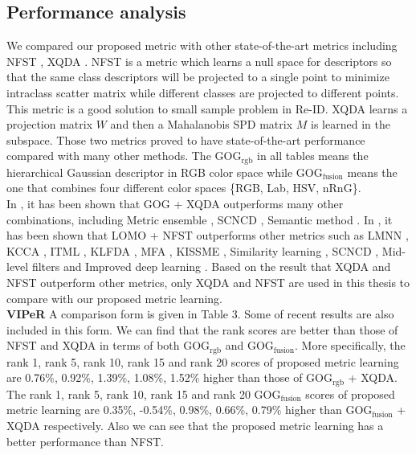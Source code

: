 \documentclass[10pt,twocolumn,letterpaper]{article}
\begin{document}
\subsection{Performance analysis}
We compared our proposed metric with other state-of-the-art metrics including NFST \cite{NFST}, XQDA \cite{LOMO}. NFST is a metric which learns a null space for descriptors so that the same class descriptors will be projected to a single point to minimize intraclass scatter matrix while different classes are projected to different points. This metric is a good solution to small sample problem in Re-ID. XQDA learns a projection matrix $W$ and then a Mahalanobis SPD matrix $M$ is learned in the subspace. Those two metrics proved to have state-of-the-art performance compared with many other methods. The GOG$_\text{rgb}$ in all tables means the hierarchical Gaussian descriptor in RGB color space while GOG$_\text{fusion}$ means the one that combines four different color spaces \{RGB, Lab, HSV, nRnG\}.\\
In \cite{GOG}, it has been shown that GOG + XQDA outperforms many other combinations, including Metric ensemble \cite{MetricEnsembles}, SCNCD \cite{SCNCD}, Semantic method \cite{SemanticMethod}. In \cite{ NFST}, it has been shown that LOMO + NFST outperforms other metrics such as LMNN \cite{LMNN}, KCCA \cite{KCCA}, ITML \cite{ITML}, KLFDA \cite{KLFDA}, MFA \cite{KernelVersionMetrics}, KISSME \cite{KISSME}, Similarity learning \cite{SimilarityLearning}, SCNCD \cite{SCNCD}, Mid-level filters \cite{MidlevelFilters} and Improved deep learning \cite{ImprovedCNN}. Based on the result that XQDA and NFST outperform other metrics, only XQDA and NFST are used in this thesis to compare with our proposed metric learning. \\
\textbf{VIPeR} A comparison form is given in Table 3. Some of recent results are also included in this form. We can find that the rank scores are better than those of NFST and XQDA in terms of both GOG$_\text{rgb}$ and GOG$_\text{fusion}$. More specifically, the rank 1, rank 5, rank 10, rank 15 and rank 20 scores of proposed metric learning are 0.76\%, 0.92\%, 1.39\%, 1.08\%, 1.52\% higher than those of GOG$_\text{rgb}$ + XQDA. The rank 1, rank 5, rank 10, rank 15 and rank 20 GOG$_\text{fusion}$ scores of proposed metric learning are 0.35\%, -0.54\%, 0.98\%, 0.66\%, 0.79\% higher than GOG$_\text{fusion}$ + XQDA respectively. Also we can see that the proposed metric learning has a better performance than NFST. 
\end{document}

